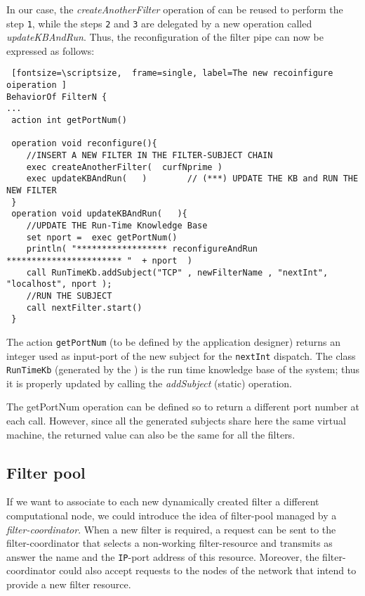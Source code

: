\documentclass{../llncs}
\begin{document}
In our case, the \textit{createAnotherFilter} operation of  can be reused to perform the step \texttt{1}, while the steps \texttt{2} and \texttt{3} are delegated by a new operation called \textit{updateKBAndRun}. Thus, the reconfiguration of the filter pipe can now be expressed as follows:

\begin{Verbatim} [fontsize=\scriptsize,  frame=single, label=The new recoinfigure oiperation ] 
BehaviorOf FilterN {    
...    
 action int getPortNum() 
	
 operation void reconfigure(){
	//INSERT A NEW FILTER IN THE FILTER-SUBJECT CHAIN  
	exec createAnotherFilter(  curfNprime ) 		
	exec updateKBAndRun(   )		// (***) UPDATE THE KB and RUN THE NEW FILTER
 }     
 operation void updateKBAndRun(   ){ 
	//UPDATE THE Run-Time Knowledge Base
	set nport =  exec getPortNum()
	println( "****************** reconfigureAndRun *********************** "  + nport  )
	call RunTimeKb.addSubject("TCP" , newFilterName , "nextInt", "localhost", nport );    
	//RUN THE SUBJECT	
 	call nextFilter.start()
 }    
\end{Verbatim}

The action \texttt{getPortNum} (to be defined by the application designer) returns an integer used as input-port of the new subject for the \texttt{nextInt} dispatch. The class \texttt{RunTimeKb} (generated by the \ide{}) is the run time knowledge base of the system; thus it is properly updated by calling the \textit{addSubject} (static) operation.

The getPortNum operation can be defined so to return a different port number at each call. However, since all the generated subjects share here the same virtual machine, the returned value can also be the same for all the filters.



\subsection{Filter pool}

If we want to associate to each new dynamically created filter a different computational node, we could introduce the idea of filter-pool managed by a \textit{filter-coordinator}.  When a new filter is required, a request can be sent to the filter-coordinator that selects a non-working  filter-resource and transmits as answer the name and the \texttt{IP}-port address of this resource.
Moreover, the filter-coordinator could also accept requests to the nodes of the network that intend to provide a new filter resource.
\end{document}
